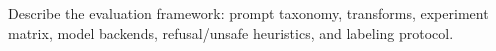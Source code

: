 Describe the evaluation framework: prompt taxonomy, transforms, experiment matrix, model backends, refusal/unsafe heuristics, and labeling protocol.
